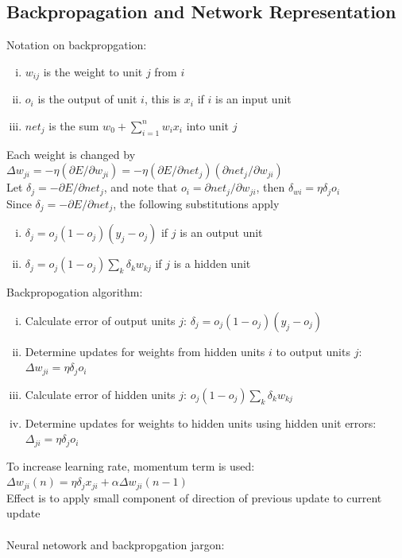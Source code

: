 \documentclass{article}
\begin{document}
		\subsection{Backpropagation and Network Representation}
			Notation on backpropgation:
			\begin{enumerate}[(i)]
			 	\item $w_{ij}$ is the weight to unit $j$ from $i$
			 	\item $o_i$ is the output of unit $i$, this is $x_i$ if $i$ is an input unit
			 	\item $net_j$ is the sum $w_0 + \sum_{i = 1}^n w_ix_i$ into unit $j$
			 	\end{enumerate} 
			Each weight is changed by $\Delta w_{ji} = -\eta(\partial{E}/\partial{w_{ji}}) = -\eta(\partial{E}/\partial{net_j})(\partial{net_j}/\partial{w_{ji}})$ \\
			Let $\delta_j = -\partial{E}/\partial{net_j}$, and note that $o_i = \partial{net_j}/\partial{w_{ji}}$, then $\delta_{wi} = \eta\delta_jo_i$ \\
			Since $\delta_j = -\partial{E}/\partial{net_j}$, the following substitutions apply
			\begin{enumerate}[(i)]
				\item $\delta_j = o_j(1 - o_j)(y_j - o_j)$ if $j$ is an output unit
				\item $\delta_j = o_j(1 - o_j)\sum_k \delta_k w_{kj}$ if $j$ is a hidden unit
				\end{enumerate}
			Backpropogation algorithm:
			\begin{enumerate}[(i)]
				\item Calculate error of output units $j$: $\delta_j = o_j(1 - o_j)(y_j - o_j)$
				\item Determine updates for weights from hidden units $i$ to output units $j$: $\Delta w_{ji} = \eta\delta_jo_i$
				\item Calculate error of hidden units $j$: $o_j(1 - o_j)\sum_k \delta_k w_{kj}$
				\item Determine updates for weights to hidden units using hidden unit errors: $\Delta_{ji} = \eta\delta_jo_i$
				\end{enumerate}
			To increase learning rate, momentum term is used: $\Delta w_{ji}(n) = \eta\delta_jx_{ji} + \alpha\Delta w_{ji}(n - 1)$ \\
			Effect is to apply small component of direction of previous update to current update \\
			\\
			Neural netowork and backpropgation jargon:
\end{document}
